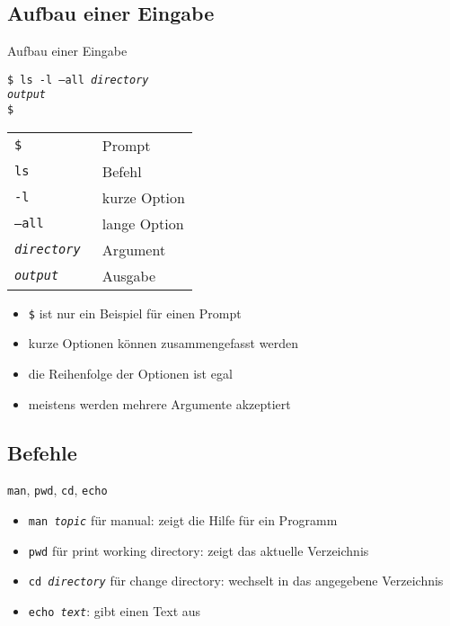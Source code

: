   \subsection{Aufbau einer Eingabe}
    \begin{frame}{Aufbau einer Eingabe}
      \begin{singlespace}
        \texttt{\$ ls -l --all \textit{directory}\\
                \textit{output}\\
                \$}
      \end{singlespace}
      \begin{center}
        \begin{tabular}{>{\tt}l l}
          \toprule
          \$                 & Prompt       \\
          ls                 & Befehl       \\
          -l                 & kurze Option \\
          --all              & lange Option \\
          \textit{directory} & Argument     \\
          \textit{output}    & Ausgabe      \\
          \bottomrule
        \end{tabular}
      \end{center}
    \end{frame}

    \begin{frame}
      \begin{itemize}
        \item \texttt{\$} ist nur ein Beispiel für einen Prompt
        \item kurze Optionen können zusammengefasst werden
        \item die Reihenfolge der Optionen ist egal
        \item meistens werden mehrere Argumente akzeptiert
      \end{itemize}
    \end{frame}

  \subsection{Befehle}
  \begin{frame}{\texttt{man}, \texttt{pwd}, \texttt{cd}, \texttt{echo}}
      \begin{itemize}
        \item \texttt{man \textit{topic}} für manual: zeigt die Hilfe für ein Programm
        \item \texttt{pwd} für print working directory: zeigt das aktuelle Verzeichnis
        \item \texttt{cd \textit{directory}} für change directory: wechselt in das angegebene Verzeichnis
        \item \texttt{echo \textit{text}}: gibt einen Text aus
      \end{itemize}
    \end{frame}


